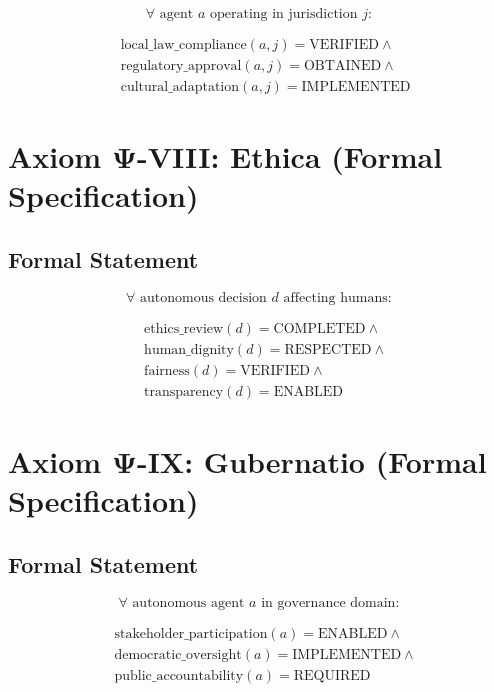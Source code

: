 \documentclass[12pt,a4paper,twoside,openright]{book}
\begin{document}
\begin{equation}
\forall \text{ agent } a \text{ operating in jurisdiction } j:
\end{equation}

\begin{align}
&\text{local\_law\_compliance}(a, j) = \text{VERIFIED} \land \\
&\text{regulatory\_approval}(a, j) = \text{OBTAINED} \land \\
&\text{cultural\_adaptation}(a, j) = \text{IMPLEMENTED}
\end{align}

\section{Axiom Ψ-VIII: Ethica (Formal Specification)}

\subsection{Formal Statement}

\begin{equation}
\forall \text{ autonomous decision } d \text{ affecting humans}:
\end{equation}

\begin{align}
&\text{ethics\_review}(d) = \text{COMPLETED} \land \\
&\text{human\_dignity}(d) = \text{RESPECTED} \land \\
&\text{fairness}(d) = \text{VERIFIED} \land \\
&\text{transparency}(d) = \text{ENABLED}
\end{align}

\section{Axiom Ψ-IX: Gubernatio (Formal Specification)}

\subsection{Formal Statement}

\begin{equation}
\forall \text{ autonomous agent } a \text{ in governance domain}:
\end{equation}

\begin{align}
&\text{stakeholder\_participation}(a) = \text{ENABLED} \land \\
&\text{democratic\_oversight}(a) = \text{IMPLEMENTED} \land \\
&\text{public\_accountability}(a) = \text{REQUIRED}
\end{align}
\end{document}
